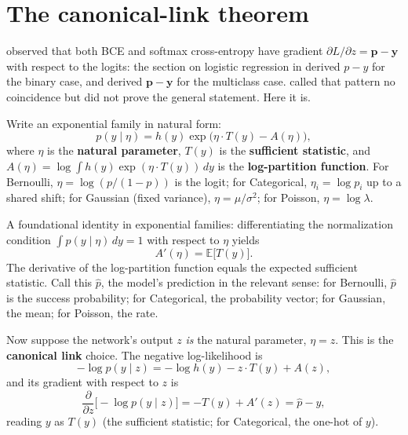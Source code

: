 
\section{The canonical-link theorem}\label{sec:canonical-link}

 observed that both BCE and softmax cross-entropy
have gradient $\partial L / \partial z = \mathbf{p} - \mathbf{y}$ with
respect to the logits: the section on logistic regression in
 derived $p - y$ for the binary case, and
 derived $\mathbf{p} - \mathbf{y}$ for the
multiclass case.  called that pattern no
coincidence but did not prove the general statement. Here it is.

Write an exponential family in natural form:
\[
  p(y \mid \eta) = h(y)\exp\bigl(\eta \cdot T(y) - A(\eta)\bigr),
\]
where $\eta$ is the \textbf{natural parameter}, $T(y)$ is the
\textbf{sufficient statistic}, and
$A(\eta) = \log \int h(y) \exp(\eta \cdot T(y))\,dy$
is the \textbf{log-partition function}.
For Bernoulli, $\eta = \log(p/(1 - p))$ is the logit; for Categorical,
$\eta_i = \log p_i$ up to a shared shift; for Gaussian (fixed variance),
$\eta = \mu/\sigma^2$; for Poisson, $\eta = \log \lambda$.

A foundational identity in exponential families: differentiating the
normalization condition $\int p(y \mid \eta)\,dy = 1$ with respect to
$\eta$ yields
\[
  A'(\eta) = \mathbb{E}\bigl[T(y)\bigr].
\]
The derivative of the log-partition function equals the expected sufficient
statistic. Call this $\hat{p}$, the model's prediction in the relevant
sense: for Bernoulli, $\hat{p}$ is the success probability; for
Categorical, the probability vector; for Gaussian, the mean; for Poisson,
the rate.

Now suppose the network's output $z$ \emph{is} the natural parameter,
$\eta = z$. This is the \textbf{canonical link} choice. The negative
log-likelihood is
\[
  -\log p(y \mid z) = -\log h(y) - z \cdot T(y) + A(z),
\]
and its gradient with respect to $z$ is
\begin{equation}\label{eq:expfam-grad}
  \frac{\partial}{\partial z}\bigl[-\log p(y \mid z)\bigr]
    = -T(y) + A'(z) = \hat{p} - y,
\end{equation}
reading $y$ as $T(y)$ (the sufficient statistic; for Categorical, the
one-hot of $y$).

